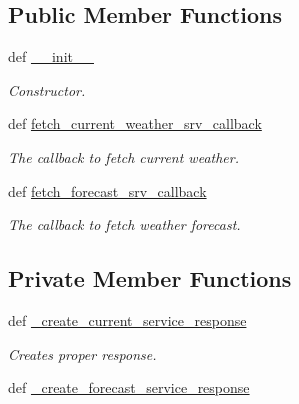 \subsection*{Public Member Functions}
\begin{DoxyCompactItemize}
\item 
def \hyperlink{classrapp__weather__reporter_1_1weather__reporter__node_1_1WeatherReporterNode_ade584654ed08cd98b8d8c207b23065e9}{\-\_\-\-\_\-init\-\_\-\-\_\-}
\begin{DoxyCompactList}\small\item\em Constructor. \end{DoxyCompactList}\item 
def \hyperlink{classrapp__weather__reporter_1_1weather__reporter__node_1_1WeatherReporterNode_abcd85c80630aa9c003645ad7662f7422}{fetch\-\_\-current\-\_\-weather\-\_\-srv\-\_\-callback}
\begin{DoxyCompactList}\small\item\em The callback to fetch current weather. \end{DoxyCompactList}\item 
def \hyperlink{classrapp__weather__reporter_1_1weather__reporter__node_1_1WeatherReporterNode_a84f98a42a4f46c46227cdc7d2ff436e5}{fetch\-\_\-forecast\-\_\-srv\-\_\-callback}
\begin{DoxyCompactList}\small\item\em The callback to fetch weather forecast. \end{DoxyCompactList}\end{DoxyCompactItemize}
\subsection*{Private Member Functions}
\begin{DoxyCompactItemize}
\item 
def \hyperlink{classrapp__weather__reporter_1_1weather__reporter__node_1_1WeatherReporterNode_a79addfb4fafa17328858c6616da26c6f}{\-\_\-create\-\_\-current\-\_\-service\-\_\-response}
\begin{DoxyCompactList}\small\item\em Creates proper response. \end{DoxyCompactList}\item 
def \hyperlink{classrapp__weather__reporter_1_1weather__reporter__node_1_1WeatherReporterNode_ae2de096bdff5461d677680a78f5d7ee4}{\-\_\-create\-\_\-forecast\-\_\-service\-\_\-response}
\end{DoxyCompactItemize}
